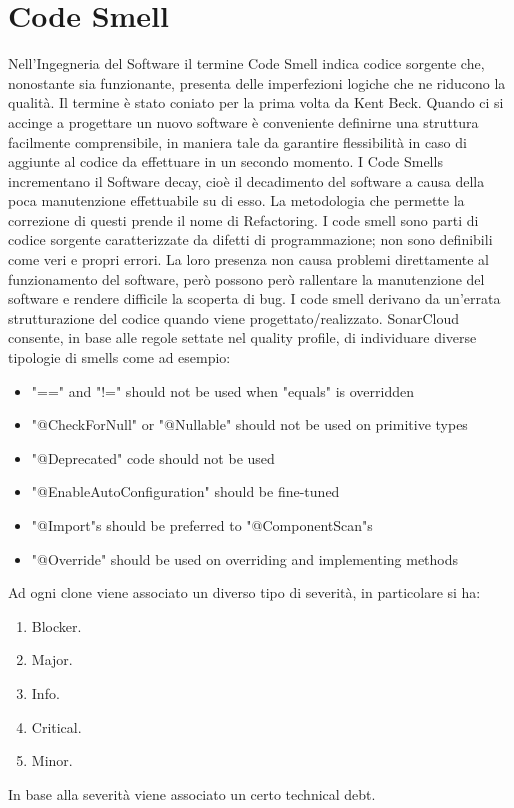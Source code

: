\section{Code Smell}
Nell’Ingegneria del Software il termine Code Smell indica codice sorgente che, nonostante sia funzionante, presenta delle imperfezioni logiche che ne riducono la qualità. Il termine è stato coniato per la prima volta da Kent Beck. Quando ci si accinge a progettare un nuovo software è conveniente definirne una struttura facilmente comprensibile, in maniera tale da garantire  flessibilità in caso di aggiunte al codice da effettuare in un secondo momento. I Code Smells incrementano il Software decay, cioè il decadimento del software a causa della poca manutenzione effettuabile su di esso. La metodologia che permette la correzione di questi prende il nome di Refactoring. I code smell sono parti di codice sorgente caratterizzate da difetti di programmazione; non sono definibili come veri e propri errori. La loro presenza non causa problemi direttamente al funzionamento del software, però possono però rallentare la manutenzione del software e rendere difficile la  scoperta di bug. I code smell derivano da un’errata strutturazione del codice quando viene progettato/realizzato. SonarCloud consente, in base alle regole settate nel quality profile, di individuare diverse tipologie di smells come ad esempio:
\begin{itemize}
\item "==" and "!=" should not be used when "equals" is overridden
\item "@CheckForNull" or "@Nullable" should not be used on primitive types
\item "@Deprecated" code should not be used
\item "@EnableAutoConfiguration" should be fine-tuned
\item "@Import"s should be preferred to "@ComponentScan"s
\item "@Override" should be used on overriding and implementing methods
\end{itemize}
Ad ogni clone viene associato un diverso tipo di severità, in particolare si ha:
\begin{enumerate}
\item Blocker.
\item Major.
\item Info.
\item Critical.
\item Minor.
\end{enumerate}
In base alla severità viene associato un certo technical debt.
